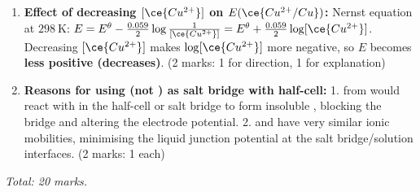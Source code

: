 \documentclass[11pt]{article}
\begin{document}
\begin{corrige}
\begin{enumerate}
\par \textbf{Equation:} . \hfill (4 marks: 1 for comparison, 1 for $E^\theta_{\text{cell}}$ calculation, 1 for conclusion, 1 for equation)
\item \textbf{Effect of decreasing $[\ce{Cu^{2+}}]$ on $E(\ce{Cu^{2+}/Cu})$:}
Nernst equation at $298\ \mathrm{K}$: $E = E^\theta - \frac{0.059}{2}\log\frac{1}{[\ce{Cu^{2+}}]} = E^\theta + \frac{0.059}{2}\log[\ce{Cu^{2+}}]$.
Decreasing $[\ce{Cu^{2+}}]$ makes $\log[\ce{Cu^{2+}}]$ more negative, so $E$ becomes \textbf{less positive (decreases)}. \hfill (2 marks: 1 for direction, 1 for explanation)
\item \textbf{Reasons for using  (not ) as salt bridge with  half-cell:}
1.  from  would react with  in the half-cell or salt bridge to form insoluble , blocking the bridge and altering the electrode potential.
2.  and  have very similar ionic mobilities, minimising the liquid junction potential at the salt bridge/solution interfaces. \hfill (2 marks: 1 each)
\end{enumerate}
\emph{Total: 20 marks.}
\end{corrige}
\end{document}
